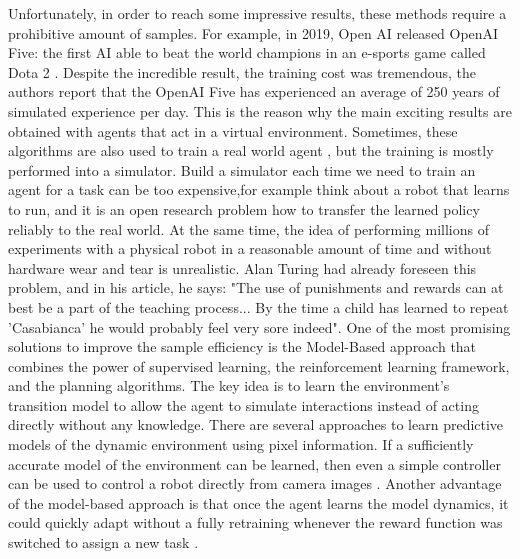 Unfortunately, in order to reach some impressive results, these methods require a prohibitive amount of samples.
For example, in 2019, Open AI released OpenAI Five: the first AI able to beat the world champions in an e-sports game called Dota 2 \cite{berner2019dota}. 
Despite the incredible result, the training cost was tremendous, the authors report that the OpenAI Five has experienced an average of 250 years of simulated experience per day. This is the reason why the main exciting results are obtained  with agents that act in a virtual environment.
Sometimes, these algorithms are also used to train a real world agent \cite{andrychowicz2020learning}, but the training is mostly performed into a simulator.
Build a simulator each time we need to train an agent for a task can be too expensive,for example think about a robot that learns to run, and it is an open research problem how to transfer the learned policy reliably to the real world.
At the same time, the idea of performing millions of experiments with a physical robot in a reasonable amount of time and without hardware wear and tear  is unrealistic.
Alan Turing had already foreseen this problem, and in his article, he says: "The use of punishments and rewards can at best be a part of the teaching process... By the time a child has learned to repeat 'Casabianca' he would probably feel very sore indeed".
One of the most promising solutions to improve the sample efficiency is the Model-Based approach that combines the power of supervised learning, the reinforcement learning framework, and the planning algorithms. 
The key idea is to learn the environment's transition model to allow the agent to simulate interactions instead of acting directly without any knowledge.
There are several approaches to learn predictive models of the dynamic environment using pixel information.
If a sufficiently accurate model of the environment can be learned, then even a simple controller can be used to control a robot directly from camera images \cite{finn2016deep}.
Another advantage of the model-based approach is that once the agent learns the model dynamics, it could quickly adapt without a fully retraining whenever the reward function was switched to assign a new task  \cite{nagabandi2018neural}.  \\

